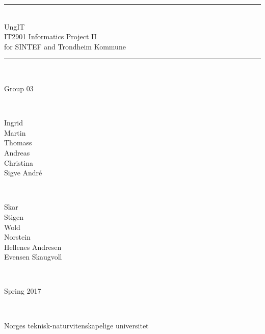\thispagestyle{empty}
\begin{center}

\noindent\rule{\textwidth}{1.3pt}
\\[1pc]
\Huge{UngIT}
\\[1pc]
\large{IT2901 Informatics Project II  \\for SINTEF and Trondheim Kommune}
\\[1pc]
\noindent\rule{\textwidth}{1.3pt}
\\[6pc]

\begin{bf}\Large{Group 03}\end{bf}
\\[1pc]

\begin{minipage}{0.3\textwidth}
	\begin{flushright} \large
		Ingrid\\
		Martin\\
		Thomass\\
		Andreas\\
        Christina\\
        Sigve André\\
	\end{flushright}
\end{minipage}~
    \begin{minipage}{0.3\textwidth}
	\begin{flushleft} \large
		Skar\\
		Stigen\\
		Wold\\
		Norstein\\
        Hellenes Andresen\\
        Evensen Skaugvoll\\
	\end{flushleft}
\end{minipage}
\\[4pc]


\begin{bf}
Spring 2017
\end{bf}
\\[8pc]


\begin{small}Norges teknisk-naturvitenskapelige universitet\end{small}

\end{center}

\pagebreak